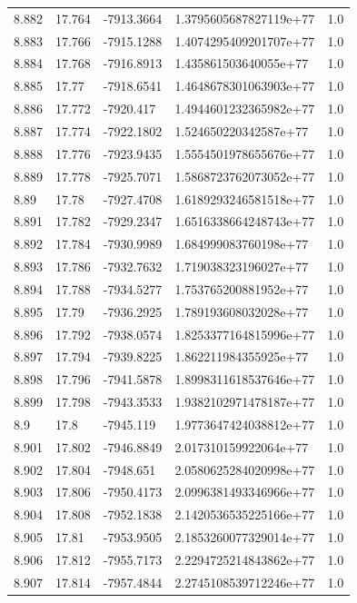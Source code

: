 \begin{tabular}{lllll}
8.882 & 17.764 & -7913.3664 & 1.3795605687827119e+77 & 1.0 \\
8.883 & 17.766 & -7915.1288 & 1.4074295409201707e+77 & 1.0 \\
8.884 & 17.768 & -7916.8913 & 1.435861503640055e+77 & 1.0 \\
8.885 & 17.77 & -7918.6541 & 1.4648678301063903e+77 & 1.0 \\
8.886 & 17.772 & -7920.417 & 1.4944601232365982e+77 & 1.0 \\
8.887 & 17.774 & -7922.1802 & 1.524650220342587e+77 & 1.0 \\
8.888 & 17.776 & -7923.9435 & 1.5554501978655676e+77 & 1.0 \\
8.889 & 17.778 & -7925.7071 & 1.5868723762073052e+77 & 1.0 \\
8.89 & 17.78 & -7927.4708 & 1.6189293246581518e+77 & 1.0 \\
8.891 & 17.782 & -7929.2347 & 1.6516338664248743e+77 & 1.0 \\
8.892 & 17.784 & -7930.9989 & 1.684999083760198e+77 & 1.0 \\
8.893 & 17.786 & -7932.7632 & 1.719038323196027e+77 & 1.0 \\
8.894 & 17.788 & -7934.5277 & 1.753765200881952e+77 & 1.0 \\
8.895 & 17.79 & -7936.2925 & 1.789193608032028e+77 & 1.0 \\
8.896 & 17.792 & -7938.0574 & 1.8253377164815996e+77 & 1.0 \\
8.897 & 17.794 & -7939.8225 & 1.862211984355925e+77 & 1.0 \\
8.898 & 17.796 & -7941.5878 & 1.8998311618537646e+77 & 1.0 \\
8.899 & 17.798 & -7943.3533 & 1.9382102971478187e+77 & 1.0 \\
8.9 & 17.8 & -7945.119 & 1.9773647424038812e+77 & 1.0 \\
8.901 & 17.802 & -7946.8849 & 2.017310159922064e+77 & 1.0 \\
8.902 & 17.804 & -7948.651 & 2.0580625284020998e+77 & 1.0 \\
8.903 & 17.806 & -7950.4173 & 2.0996381493346966e+77 & 1.0 \\
8.904 & 17.808 & -7952.1838 & 2.1420536535225166e+77 & 1.0 \\
8.905 & 17.81 & -7953.9505 & 2.1853260077329014e+77 & 1.0 \\
8.906 & 17.812 & -7955.7173 & 2.2294725214843862e+77 & 1.0 \\
8.907 & 17.814 & -7957.4844 & 2.2745108539712246e+77 & 1.0 \\

\end{tabular}
